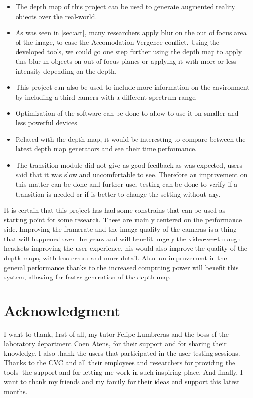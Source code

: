 \documentclass[10pt,a4paper,twocolumn,twoside]{article}
\begin{document}
	\begin{itemize}
		\item The depth map of this project can be used to generate augmented reality objects over the real-world.
		
		\item As was seen in \ref{sec:art}, many researchers apply blur on the out of focus area of the image, to ease the Accomodation-Vergence conflict. Using the developed tools, we could go one step further using the depth map to apply this blur in objects on out of focus planes or applying it with more or less intensity depending on the depth. 
		
		\item This project can also be used to include more information on the environment by including a third camera with a different spectrum range.  
		
		\item Optimization of the software can be done to allow to use it on smaller and less powerful devices. 
		
		\item Related with the depth map, it would be interesting to compare between the latest depth map generators and see their time performance. 
		
		\item The transition module did not give as good feedback as was expected, users said that it was slow and uncomfortable to see. Therefore an improvement on this matter can be done and further user testing can be done to verify if a transition is needed or if is better to change the setting without any.
	\end{itemize}

	It is certain that this project has had some constrains that can be used as starting point for some research. These are mainly centered on the performance side. Improving the framerate and the image quality of the cameras is a thing that will happened over the years and will benefit hugely the video-see-through headsets improving the user experience.
	his would also improve the quality of the depth maps, with less errors and more detail. Also, an improvement in the general performance thanks to the increased computing power will benefit this system, allowing for faster generation of the depth map.  
	
	\section*{Acknowledgment}
	I want to thank, first of all, my tutor Felipe Lumbreras and the boss of the laboratory department Coen Atens, for their support and for sharing their knowledge. I also thank the users that participated in the user testing sessions. Thanks to the CVC and all their employees and researchers for providing the tools, the support and for letting me work in such inspiring place. And finally, I want to thank my friends and my family for their ideas and support this latest months. 
	
\end{document}
